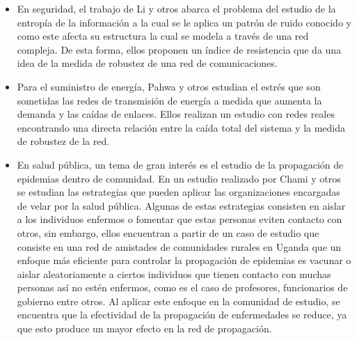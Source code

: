 \begin{itemize}
    \item En seguridad, el trabajo de Li y otros\cite{Li2016} abarca el problema del estudio de la entropía de la información a la cual se le aplica un patrón de ruido conocido y como este afecta su estructura la cual se modela a través de una red compleja. De esta forma, ellos proponen un índice de resistencia que da una idea de la medida de robustez de una red de comunicaciones.
    \item Para el suministro de energía, Pahwa y otros\cite{Pahwa2014} estudian el estrés que son sometidas las redes de transmisión de energía a medida que aumenta la demanda y las caídas de enlaces. Ellos realizan un estudio con redes reales encontrando una directa relación entre la caída total del sistema y la medida de robustez de la red.
    \item En salud pública, un tema de gran interés es el estudio de la propagación de epidemias dentro de comunidad. En un estudio realizado por Chami y otros\cite{Chami2017} se estudian las estrategias que pueden aplicar las organizaciones encargadas de velar por la salud pública. Algunas de estas estrategias consisten en aislar a los individuos enfermos o fomentar que estas personas eviten contacto con otros, sin embargo, ellos encuentran a partir de un caso de estudio que consiste en una red de amistades de comunidades rurales en Uganda que un enfoque más eficiente para controlar la propagación de epidemias es vacunar o aislar aleatoriamente a ciertos individuos que tienen contacto con muchas personas así no estén enfermos, como es el caso de profesores, funcionarios de gobierno entre otros. Al aplicar este enfoque en la comunidad de estudio, se encuentra que la efectividad de la propagación de enfermedades se reduce, ya que esto produce un mayor efecto en la red de propagación.
\end{itemize}